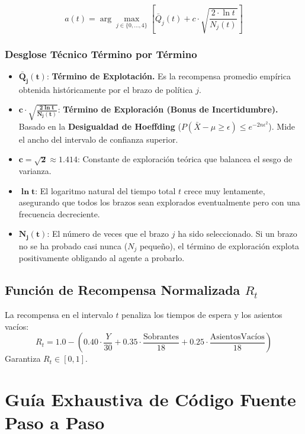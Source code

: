 \documentclass[12pt,letterpaper]{article}
\begin{document}
\begin{equation}
	a(t) = \arg\max_{j \in \{0, \dots, 4\}} \left[ \bar{Q}_j(t) + c \cdot \sqrt{\frac{2 \cdot \ln t}{N_j(t)}} \right]
\end{equation}

\subsubsection{Desglose Técnico Término por Término}
\begin{itemize}
	\item $\mathbf{\bar{Q}_j(t)}$: \textbf{Término de Explotación.} Es la recompensa promedio empírica obtenida históricamente por el brazo de política $j$.
	\item $\mathbf{c \cdot \sqrt{\frac{2 \ln t}{N_j(t)}}}$: \textbf{Término de Exploración (Bonus de Incertidumbre).} Basado en la \textbf{Desigualdad de Hoeffding} ($P(\bar{X} - \mu \ge \epsilon) \le e^{-2n\epsilon^2}$). Mide el ancho del intervalo de confianza superior.
	\item $\mathbf{c = \sqrt{2} \approx 1.414}$: Constante de exploración teórica que balancea el sesgo de varianza.
	\item $\mathbf{\ln t}$: El logaritmo natural del tiempo total $t$ crece muy lentamente, asegurando que todos los brazos sean explorados eventualmente pero con una frecuencia decreciente.
	\item $\mathbf{N_j(t)}$: El número de veces que el brazo $j$ ha sido seleccionado. Si un brazo no se ha probado casi nunca ($N_j$ pequeño), el término de exploración explota positivamente obligando al agente a probarlo.
\end{itemize}

\subsection{Función de Recompensa Normalizada $R_t$}
La recompensa en el intervalo $t$ penaliza los tiempos de espera y los asientos vacíos:
\begin{equation}
	R_t = 1.0 - \left( 0.40 \cdot \frac{Y}{30} + 0.35 \cdot \frac{\text{Sobrantes}}{18} + 0.25 \cdot \frac{\text{AsientosVacíos}}{18} \right)
\end{equation}
Garantiza $R_t \in [0, 1]$.

\newpage
\section{Guía Exhaustiva de Código Fuente Paso a Paso}
\end{document}
